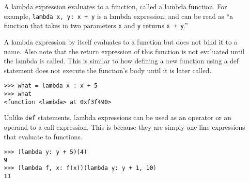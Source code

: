 A lambda expression evaluates to a function, called a lambda function. For example, \texttt{lambda x, y: x + y} is a lambda expression, and can be read as “a function that takes in two parameters \texttt{x} and \texttt{y} returns \texttt{x + y}.” 

A lambda expression by itself evaluates to a function but does not bind it to a name. Also note that the return expression of this function is not evaluated until the lambda is called. This is similar to how defining a new function using a def statement does not execute the function’s body until it is later called. 

\begin{lstlisting}[linewidth=\textwidth]
>>> what = lambda x : x + 5
>>> what
<function <lambda> at 0xf3f490>
\end{lstlisting}


Unlike \texttt{def} statements, lambda expressions can be used as an operator or an operand to a call expression. This is because they are simply one-line expressions that evaluate to functions.

\begin{lstlisting}[linewidth=\textwidth]
>>> (lambda y: y + 5)(4) 
9
>>> (lambda f, x: f(x))(lambda y: y + 1, 10)
11
\end{lstlisting}